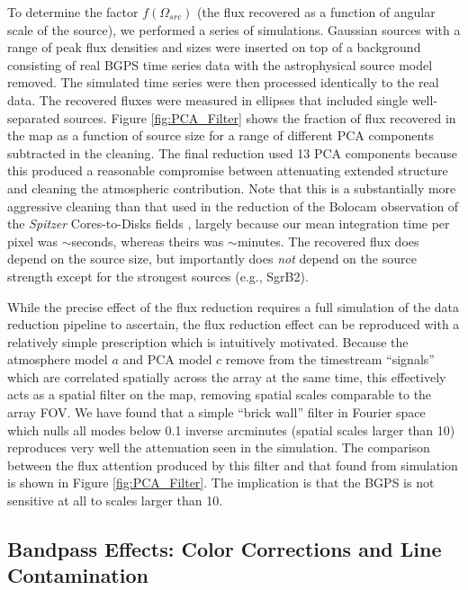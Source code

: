 \documentclass[12pt,preprint]{aastex}
\begin{document}
To determine the factor $f(\Omega_{src})$ (the flux recovered as a
function of angular scale of the source), we performed a series of
simulations.  Gaussian sources with a range of peak flux densities and
sizes were inserted on top of a background consisting of real BGPS
time series data with the astrophysical source model removed.  The
simulated time series were then processed identically to the real
data.  The recovered fluxes were measured in ellipses that included
single well-separated sources.  Figure \ref{fig:PCA_Filter} shows the
fraction of flux recovered in the map as a function of source size for
a range of different PCA components subtracted in the cleaning.  The
final reduction used 13 PCA components because this produced a
reasonable compromise between attenuating extended structure and
cleaning the atmospheric contribution.  Note that this is a
substantially more aggressive cleaning than that used in the reduction
of the Bolocam observation of the {\em Spitzer} Cores-to-Disks fields
\citep{enoch06,young06,enoch07}, largely because our mean integration
time per pixel was $\sim$seconds, whereas theirs was $\sim$minutes.
The recovered flux does depend on the source size, but importantly
does {\it not} depend on the source strength except for the strongest
sources (e.g., SgrB2).

While the precise effect of the flux reduction requires a full
simulation of the data reduction pipeline to ascertain, the flux
reduction effect can be reproduced with a relatively simple
prescription which is intuitively motivated.  Because the atmosphere
model $a$ and PCA model $c$ remove from the timestream ``signals''
which are correlated spatially across the array at the same time, this
effectively acts as a spatial filter on the map, removing spatial
scales comparable to the array FOV.  We have found that a simple
``brick wall'' filter in Fourier space which nulls all modes below 0.1
inverse arcminutes (spatial scales larger than 10\arcmin) reproduces
very well the attenuation seen in the simulation.  The comparison
between the flux attention produced by this filter and that found from
simulation is shown in Figure \ref{fig:PCA_Filter}.  The implication
is that the BGPS is not sensitive at all to scales larger than
10\arcmin.

\subsection{Bandpass Effects: Color Corrections and Line Contamination}
\end{document}
